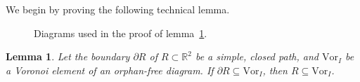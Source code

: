 \documentclass[11pt]{article}
\newtheorem{lemma}{Lemma}
\newcommand{\Vor}{\text{Vor}}
\begin{document}
We begin by proving the following technical lemma. 





\begin{figure}[htbp]
   \centering
	\quad\quad\quad
   \caption{Diagrams used in the proof of lemma~\ref{lem:RSC}. }
   \label{fig:RSC}
\end{figure}



\begin{lemma}\label{lem:RSC}
	Let the boundary $\partial R$ of $R\subset\mathbb{R}^2$ be a simple, closed path, 
		and $\Vor_I$ be a Voronoi element of an orphan-free diagram. 
	If $\partial R\subseteq\Vor_I$, then $R\subseteq\Vor_I$. 		
\end{lemma}
\end{document}
